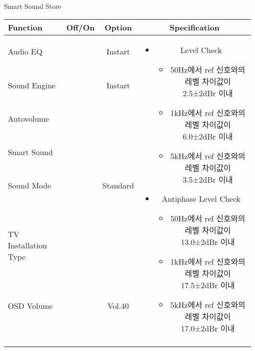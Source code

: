 \begin{frame}[t]{Smart Sound Store}
\begin{tiny}
\begin{tabular}{@{}lccc@{}}
\toprule
Function & Off/On & Option & Specification \\
\midrule
Audio EQ & \color{black}{Off} & Instart &
\multirow{10}{60mm}{
\begin{itemize}
\item Level Check
	\begin{itemize}
	\item 50Hz에서 ref 신호와의 레벨 차이값이 2.5±2dBr 이내
	\item 1kHz에서 ref 신호와의 레벨 차이값이 6.0±2dBr 이내
	\item 5kHz에서 ref 신호와의 레벨 차이값이 3.5±2dBr 이내
	\end{itemize}
\item Antiphase Level Check
	\begin{itemize}
	\item 50Hz에서 ref 신호와의 레벨 차이값이 13.0±2dBr 이내
	\item 1kHz에서 ref 신호와의 레벨 차이값이 17.5±2dBr 이내
	\item 5kHz에서 ref 신호와의 레벨 차이값이 17.0±2dBr 이내
	\end{itemize}
\end{itemize}
} \\
Sound Engine & \color{blue}{On} & Instart & \\
Autovolume & \color{black}{Off} & & \\
Smart Sound & \color{blue}{On} & & \\
Sound Mode & \color{blue}{On} & Standard & \\
TV Installation Type & \color{blue}{On} & \color{black}{Standtype1} & \\
OSD Volume & \color{blue}{On} & Vol.40 & \\
& & & \\
& & & \\
& & & \\
& & & \\\midrule
\end{tabular}
\end{tiny}

\end{frame}